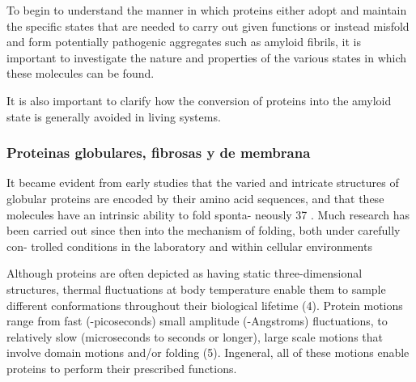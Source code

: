 To begin to understand the manner in which proteins either adopt and maintain the specific states that are needed to carry out given functions or instead misfold
and form potentially pathogenic aggregates such as amyloid fibrils, it is important to investigate the nature and properties of the various states in which these molecules
can be found.  %

It is also important to clarify how the conversion of proteins into the amyloid state is generally avoided in living systems.  %





















\subsubsection{Proteinas globulares, fibrosas y de membrana}


It became evident from early studies that
the varied and intricate structures of globular proteins
are encoded by their amino acid sequences, and that
these molecules have an intrinsic ability to fold sponta-
neously 37 . Much research has been carried out since then
into the mechanism of folding, both under carefully con-
trolled conditions in the laboratory and within cellular
environments



Although proteins are often depicted as having static three-dimensional structures,
thermal fluctuations at body temperature enable them to sample different conformations
throughout their biological lifetime (4). Protein motions range from fast (-picoseconds)
small amplitude (-Angstroms) fluctuations, to relatively slow (microseconds to seconds
or longer), large scale motions that involve domain motions and/or folding (5).
Ingeneral, all of these motions enable proteins to perform their prescribed functions.

